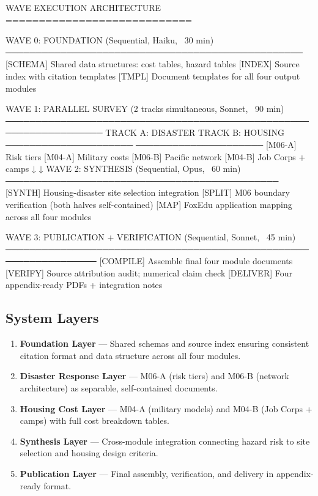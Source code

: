 \documentclass[11pt,letterpaper]{article}
\begin{document}
\begin{asciibox}
WAVE EXECUTION ARCHITECTURE
============================

  WAVE 0: FOUNDATION (Sequential, Haiku, ~30 min)
  ─────────────────────────────────────────────────
  [SCHEMA] Shared data structures: cost tables, hazard tables
  [INDEX]  Source index with citation templates
  [TMPL]   Document templates for all four output modules

  WAVE 1: PARALLEL SURVEY (2 tracks simultaneous, Sonnet, ~90 min)
  ──────────────────────────────────────────────────────────────────
  TRACK A: DISASTER            TRACK B: HOUSING
  ─────────────────────        ─────────────────────
  [M06-A] Risk tiers           [M04-A] Military costs
  [M06-B] Pacific network      [M04-B] Job Corps + camps
           ↓                            ↓
  WAVE 2: SYNTHESIS (Sequential, Opus, ~60 min)
  ─────────────────────────────────────────────
  [SYNTH] Housing-disaster site selection integration
  [SPLIT] M06 boundary verification (both halves self-contained)
  [MAP]   FoxEdu application mapping across all four modules

  WAVE 3: PUBLICATION + VERIFICATION (Sequential, Sonnet, ~45 min)
  ─────────────────────────────────────────────────────────────────
  [COMPILE] Assemble final four module documents
  [VERIFY]  Source attribution audit; numerical claim check
  [DELIVER] Four appendix-ready PDFs + integration notes
\end{asciibox}

\subsection{System Layers}

\begin{enumerate}[leftmargin=1.5em]
  \item \textbf{Foundation Layer} --- Shared schemas and source index ensuring consistent citation format and data structure across all four modules.
  \item \textbf{Disaster Response Layer} --- M06-A (risk tiers) and M06-B (network architecture) as separable, self-contained documents.
  \item \textbf{Housing Cost Layer} --- M04-A (military models) and M04-B (Job Corps + camps) with full cost breakdown tables.
  \item \textbf{Synthesis Layer} --- Cross-module integration connecting hazard risk to site selection and housing design criteria.
  \item \textbf{Publication Layer} --- Final assembly, verification, and delivery in appendix-ready format.
\end{enumerate}
\end{document}
